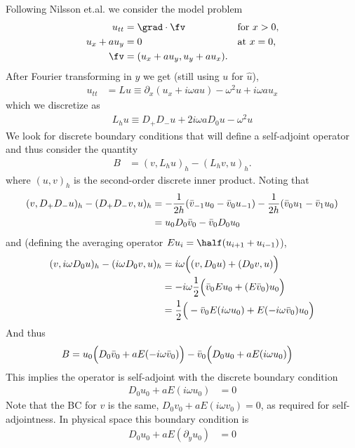 Following Nilsson et.al. we consider the model problem
\begin{alignat}{3}
   u_{tt} &= \grad\cdot\fv  && \text{for $x>0$}, \\
   u_x+au_y &=0 && \text{at $x=0$}, \\
    \fv &= ( u_x + a u_y, u_y + au_x).
\end{alignat}
After Fourier transforming in $y$ we get (still using $u$ for $\hat{u}$), 
\begin{align*}
   u_{tt} &= L u \equiv \partial_x( u_x + i\omega a u) - \omega^2 u + i \omega a u_x
\end{align*}
which we discretize as
\begin{align*}
    L_h u \equiv D_+D_- u + 2 i\omega a D_0 u - \omega^2 u 
\end{align*}
We look for discrete boundary conditions that will define a self-adjoint operator and thus consider
the quantity
\begin{align*}
  B &= (v,  L_h u)_h - (L_h v,u)_h. 
\end{align*}
where $(u,v)_h$ is the second-order discrete inner product. 
Noting that
\begin{align*}
   (v,D_+D_-u)_h - (D_+D_- v,u)_h &= -\frac{1}{2h}( \bar{v}_{-1}u_0 - \bar{v}_0 u_{-1}) -\frac{1}{2h}( \bar{v}_{0}u_1 - \bar{v}_1 u_{0}) \\
                    &= u_0 D_0 \bar{v}_0 - \bar{v}_0 D_0 u_0
\end{align*}
and (defining the averaging operator $E u_i=\half(u_{i+1}+u_{i-1})$), 
\begin{align*}
   (v, i\omega D_0 u)_h - (i\omega D_0 v,u)_h &= i\omega\Big( (v, D_0 u) + (D_0 v,u) \Big) \\
    &= - i\omega \frac{1}{2} \Big( \bar{v}_0 E u_0 + (E\bar{v}_0) u_0 \Big) \\
    &=           \frac{1}{2} \Big( -\bar{v}_0 E(i\omega u_0) + E(-i\omega\bar{v}_0) u_0 \Big) 
\end{align*}
And thus
\begin{align*}
  B &= u_0 \Big( D_0 \bar{v}_0 + a E(-i\omega\bar{v}_0) \Big) - \bar{v}_0 \Big( D_0 u_0 + a E(i\omega u_0)  \Big)
\end{align*}
This implies the operator is self-adjoint with the discrete boundary condition
\begin{align*}
   D_0 u_0 + a E(i\omega u_0) &=0 
\end{align*}
Note that the BC for $v$ is the same, $D_0 v_0 + a E(i\omega v_0) =0$, as required for self-adjointness. 
In physical space this boundary condition is 
\begin{align*}
   D_0 u_0 + a E(\partial_y u_0) &=0 
\end{align*}
